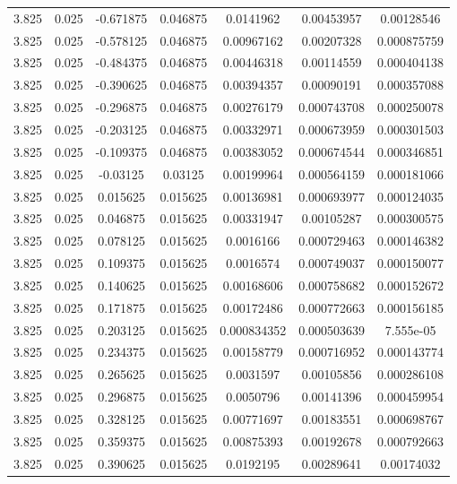 \begin{table}[bh]
\begin{center}
{\begin{tabular}{ccccccc}
3.825	 & 0.025 & 	-0.671875	 & 0.046875	 & 0.0141962	 & 0.00453957	 & 0.00128546 \\ 
3.825	 & 0.025 & 	-0.578125	 & 0.046875	 & 0.00967162	 & 0.00207328	 & 0.000875759 \\ 
3.825	 & 0.025 & 	-0.484375	 & 0.046875	 & 0.00446318	 & 0.00114559	 & 0.000404138 \\ 
3.825	 & 0.025 & 	-0.390625	 & 0.046875	 & 0.00394357	 & 0.00090191	 & 0.000357088 \\ 
3.825	 & 0.025 & 	-0.296875	 & 0.046875	 & 0.00276179	 & 0.000743708	 & 0.000250078 \\ 
3.825	 & 0.025 & 	-0.203125	 & 0.046875	 & 0.00332971	 & 0.000673959	 & 0.000301503 \\ 
3.825	 & 0.025 & 	-0.109375	 & 0.046875	 & 0.00383052	 & 0.000674544	 & 0.000346851 \\ 
3.825	 & 0.025 & 	-0.03125	 & 0.03125	 & 0.00199964	 & 0.000564159	 & 0.000181066 \\ 
3.825	 & 0.025 & 	0.015625	 & 0.015625	 & 0.00136981	 & 0.000693977	 & 0.000124035 \\ 
3.825	 & 0.025 & 	0.046875	 & 0.015625	 & 0.00331947	 & 0.00105287	 & 0.000300575 \\ 
3.825	 & 0.025 & 	0.078125	 & 0.015625	 & 0.0016166	 & 0.000729463	 & 0.000146382 \\ 
3.825	 & 0.025 & 	0.109375	 & 0.015625	 & 0.0016574	 & 0.000749037	 & 0.000150077 \\ 
3.825	 & 0.025 & 	0.140625	 & 0.015625	 & 0.00168606	 & 0.000758682	 & 0.000152672 \\ 
3.825	 & 0.025 & 	0.171875	 & 0.015625	 & 0.00172486	 & 0.000772663	 & 0.000156185 \\ 
3.825	 & 0.025 & 	0.203125	 & 0.015625	 & 0.000834352	 & 0.000503639	 & 7.555e-05 \\ 
3.825	 & 0.025 & 	0.234375	 & 0.015625	 & 0.00158779	 & 0.000716952	 & 0.000143774 \\ 
3.825	 & 0.025 & 	0.265625	 & 0.015625	 & 0.0031597	 & 0.00105856	 & 0.000286108 \\ 
3.825	 & 0.025 & 	0.296875	 & 0.015625	 & 0.0050796	 & 0.00141396	 & 0.000459954 \\ 
3.825	 & 0.025 & 	0.328125	 & 0.015625	 & 0.00771697	 & 0.00183551	 & 0.000698767 \\ 
3.825	 & 0.025 & 	0.359375	 & 0.015625	 & 0.00875393	 & 0.00192678	 & 0.000792663 \\ 
3.825	 & 0.025 & 	0.390625	 & 0.015625	 & 0.0192195	 & 0.00289641	 & 0.00174032 \\ 

\end{tabular}}
\end{center}
\end{table}
